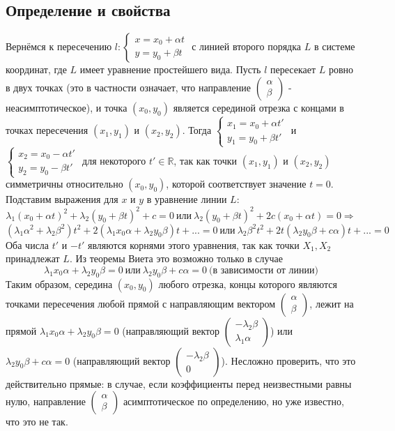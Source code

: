 \documentclass[a4paper, 12pt]{article}
\theoremstyle{definition}
\begin{document}
	\subsection{Определение и свойства}
	Вернёмся к пересечению $l: \begin{cases}
		x = x_0 + \alpha t\\
		y = y_0 + \beta t
		\end{cases}$
		с линией второго порядка $L$ в системе координат, где $L$ имеет уравнение простейшего вида. Пусть $l$ пересекает $L$ ровно в двух точках (это в частности означает, что направление $\begin{pmatrix} \alpha \\ \beta \end{pmatrix}$ - неасимптотическое), и точка $(x_0, y_0)$ является серединой отрезка с концами в точках пересечения $(x_1, y_1)$ и $(x_2, y_2)$. Тогда $\begin{cases}
			x_1 = x_0 + \alpha t'\\
			y_1 = y_0 + \beta t'
		\end{cases}$ и $
		\begin{cases}
			x_2 = x_0 - \alpha t'\\
			y_2 = y_0 - \beta t'
		\end{cases}$
		для некоторого $t' \in \mathbb{R}$, так как точки $(x_1, y_1)$ и $(x_2, y_2)$ симметричны относительно $(x_0, y_0)$, которой соответствует значение $t = 0$.\\
		Подставим выражения для $x$ и $y$ в уравнение линии $L$: $$\lambda_1(x_0 + \alpha t)^2 + \lambda_2(y_0 + \beta t)^2 + c = 0\ \text{или} \ \lambda_2(y_0 + \beta t)^2 + 2c(x_0 + \alpha t) = 0 \Rightarrow$$$$(\lambda_1\alpha^2 + \lambda_2\beta^2)t^2 + 2(\lambda_1x_0\alpha + \lambda_2y_0\beta)t + ... = 0 \ \text{или} \ \lambda_2\beta^2t^2 + 2t(\lambda_2y_0\beta + c\alpha)t + ... = 0$$
		Оба числа $t'$ и $-t'$ являются корнями этого уравнения, так как точки $X_1, X_2$ принадлежат $L$. Из теоремы Виета это возможно только в случае $$\lambda_1x_0\alpha + \lambda_2y_0\beta = 0 \ \text{или} \ \lambda_2y_0\beta + c\alpha = 0 \ \text{(в зависимости от линии)}$$
		Таким образом, середина $(x_0, y_0)$ любого отрезка, концы которого являются точками пересечения любой прямой с направляющим вектором $\begin{pmatrix} \alpha \\ \beta \end{pmatrix}$, лежит на прямой $\lambda_1x_0\alpha + \lambda_2y_0\beta = 0$ (направляющий вектор $\begin{pmatrix} -\lambda_2\beta \\ \lambda_1\alpha \end{pmatrix}$) или $\lambda_2y_0\beta + c\alpha = 0$ (направляющий вектор $\begin{pmatrix} -\lambda_2\beta \\ 0 \end{pmatrix}$). Несложно проверить, что это действительно прямые: в случае, если коэффициенты перед неизвестными равны нулю, направление $\begin{pmatrix} \alpha \\ \beta \end{pmatrix}$ асимптотическое по определению, но уже известно, что это не так.\\
\end{document}

